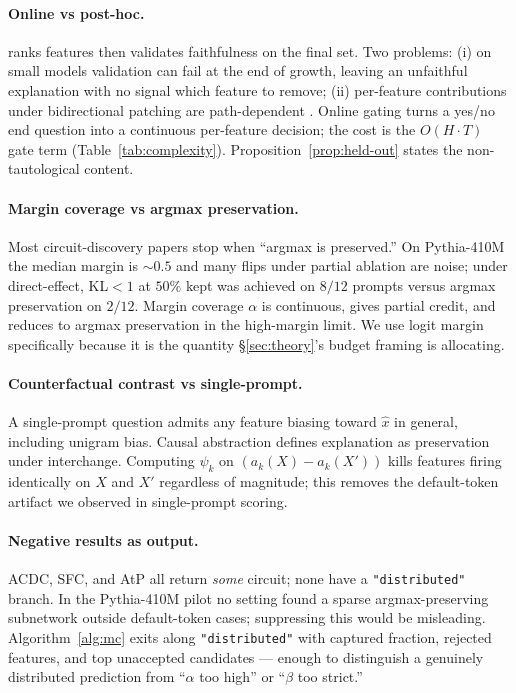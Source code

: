 \documentclass[10pt]{article}
\begin{document}
\paragraph{Online vs post-hoc.} \citet{marks2024sparse} ranks features then validates faithfulness on the final set. Two problems: (i) on small models validation can fail at the end of growth, leaving an unfaithful explanation with no signal which feature to remove; (ii) per-feature contributions under bidirectional patching are path-dependent \citep{hanna2024faithfulness}. Online gating turns a yes/no end question into a continuous per-feature decision; the cost is the $O(H \cdot T)$ gate term (Table~\ref{tab:complexity}). Proposition~\ref{prop:held-out} states the non-tautological content.

\paragraph{Margin coverage vs argmax preservation.} Most circuit-discovery papers stop when ``argmax is preserved.'' On Pythia-410M the median margin is $\sim 0.5$ and many flips under partial ablation are noise; under direct-effect, KL$<1$ at $50\%$ kept was achieved on $8/12$ prompts versus argmax preservation on $2/12$. Margin coverage $\alpha$ is continuous, gives partial credit, and reduces to argmax preservation in the high-margin limit. We use logit margin specifically because it is the quantity \S\ref{sec:theory}'s budget framing is allocating.

\paragraph{Counterfactual contrast vs single-prompt.} A single-prompt question admits any feature biasing toward $\hat x$ in general, including unigram bias. Causal abstraction \citep{geiger2021causal} defines explanation as preservation under interchange. Computing $\psi_k$ on $(a_k(X) - a_k(X'))$ kills features firing identically on $X$ and $X'$ regardless of magnitude; this removes the default-token artifact we observed in single-prompt scoring.

\paragraph{Negative results as output.} ACDC, SFC, and AtP all return \emph{some} circuit; none have a \texttt{"distributed"} branch. In the Pythia-410M pilot no setting found a sparse argmax-preserving subnetwork outside default-token cases; suppressing this would be misleading. Algorithm~\ref{alg:mc} exits along \texttt{"distributed"} with captured fraction, rejected features, and top unaccepted candidates --- enough to distinguish a genuinely distributed prediction from ``$\alpha$ too high'' or ``$\beta$ too strict.''
\end{document}
